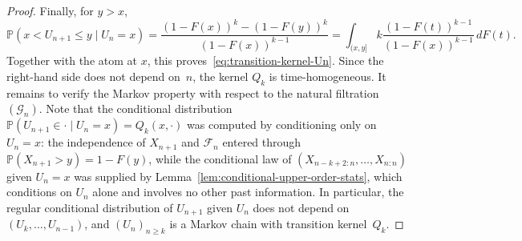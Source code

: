 \documentclass[10pt,a4paper]{amsart}
\begin{document}
\begin{proof}
Finally, for $y>x$,
\[
\mathbb{P}(x<U_{n+1}\le y\mid U_n=x)
=
\frac{(1-F(x))^k-(1-F(y))^k}{(1-F(x))^{k-1}}
=
\int_{(x,y]}
k\frac{(1-F(t))^{k-1}}{(1-F(x))^{k-1}}\,dF(t).
\]
Together with the atom at $x$, this proves~\eqref{eq:transition-kernel-Un}.
Since the right-hand side does not depend on~$n$, the kernel $Q_k$ is
time-homogeneous. It remains to verify the Markov property with respect
to the natural filtration $(\mathcal{G}_n)$.
Note that the conditional distribution
$\mathbb{P}(U_{n+1}\in\cdot\mid U_n=x)=Q_k(x,\cdot)$
was computed by conditioning only on $U_n=x$: the independence of
$X_{n+1}$ and $\mathcal{F}_n$ entered through $\mathbb{P}(X_{n+1}>y)=1-F(y)$,
while the conditional law of
$(X_{n-k+2:n},\dots,X_{n:n})$ given $U_n=x$ was supplied by
Lemma~\ref{lem:conditional-upper-order-stats}, which conditions
on $U_n$ alone and involves no other past information.
In particular, the regular conditional distribution of
$U_{n+1}$ given $U_n$ does not depend on $(U_k,\dots,U_{n-1})$, and
$(U_n)_{n\ge k}$ is a Markov chain with transition kernel~$Q_k$.
\end{proof}
\end{document}
